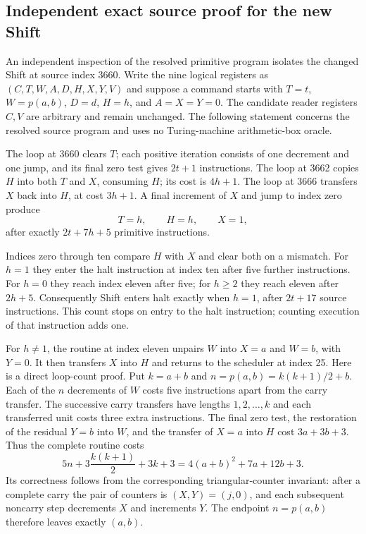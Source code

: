 \subsection{Independent exact source proof for the new Shift}
\label{sec:shift-independent}

An independent inspection of the resolved primitive program isolates the
changed Shift at source index 3660.  Write the nine logical registers as
$(C,T,W,A,D,H,X,Y,V)$ and suppose a command starts with
$T=t$, $W=p(a,b)$, $D=d$, $H=h$, and $A=X=Y=0$.
The candidate reader registers $C,V$ are arbitrary and remain unchanged.
The following statement concerns the resolved source program and uses no
Turing-machine arithmetic-box oracle.

The loop at 3660 clears $T$; each positive iteration consists of one
decrement and one jump, and its final zero test gives $2t+1$ instructions.
The loop at 3662 copies $H$ into both $T$ and $X$, consuming $H$;
its cost is $4h+1$.  The loop at 3666 transfers $X$ back into $H$,
at cost $3h+1$.  A final increment of $X$ and jump to index zero
produce
\[
 T=h,\qquad H=h,\qquad X=1,
\]
after exactly $2t+7h+5$ primitive instructions.

Indices zero through ten compare $H$ with $X$ and clear both on a
mismatch.  For $h=1$ they enter the halt instruction at index ten after
five further instructions.  For $h=0$ they reach index eleven after
five; for $h\ge2$ they reach eleven after $2h+5$.  Consequently
Shift enters halt exactly when $h=1$, after $2t+17$ source instructions.
This count stops on entry to the halt instruction; counting execution of
that instruction adds one.

For $h\ne1$, the routine at index eleven unpairs $W$ into
$X=a$ and $W=b$, with $Y=0$.  It then transfers $X$ into $H$ and
returns to the scheduler at index 25.  Here is a direct loop-count proof.
Put $k=a+b$ and $n=p(a,b)=k(k+1)/2+b$.  Each of the $n$ decrements
of $W$ costs five instructions apart from the carry transfer.
The successive carry transfers have lengths $1,2,\ldots,k$ and each
transferred unit costs three extra instructions. The final zero test,
the restoration of the residual $Y=b$ into $W$, and the transfer of
$X=a$ into $H$ cost $3a+3b+3$.  Thus the complete routine costs
\[
 5n+3\frac{k(k+1)}2+3k+3
   =4(a+b)^2+7a+12b+3.
\]
Its correctness follows from the corresponding triangular-counter
invariant: after a complete carry the pair of counters is $(X,Y)=(j,0)$,
and each subsequent noncarry step decrements $X$ and increments $Y$.
The endpoint $n=p(a,b)$ therefore leaves exactly $(a,b)$.

